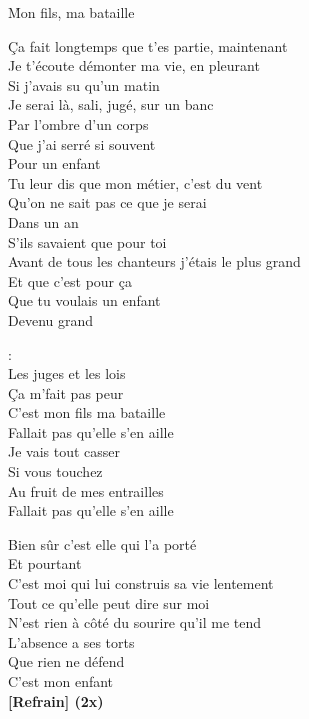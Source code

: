 \documentclass{novel}
\begin{document}
\newpage
\large

\h*{Mon fils, ma bataille}

\begin{multicols}{2}
Ça fait longtemps que t'es partie, maintenant\\
Je t'écoute démonter ma vie, en pleurant\\
Si j'avais su qu'un matin\\
Je serai là, sali, jugé, sur un banc\\
Par l'ombre d'un corps\\
Que j'ai serré si souvent\\
Pour un enfant\\

Tu leur dis que mon métier, c'est du vent\\
Qu'on ne sait pas ce que je serai\\
Dans un an\\
S'ils savaient que pour toi\\
Avant de tous les chanteurs j'étais le plus grand\\
Et que c'est pour ça\\
Que tu voulais un enfant\\
Devenu grand\\

\columnbreak
\begin{bfseries}
[Refrain]:\\
Les juges et les lois\\
Ça m'fait pas peur\\
C'est mon fils ma bataille\\
Fallait pas qu'elle s'en aille\\
Je vais tout casser\\
Si vous touchez\\
Au fruit de mes entrailles\\
Fallait pas qu'elle s'en aille\\
\end{bfseries}

Bien sûr c'est elle qui l'a porté\\
Et pourtant\\
C'est moi qui lui construis sa vie lentement\\
Tout ce qu'elle peut dire sur moi\\
N'est rien à côté du sourire qu'il me tend\\
L'absence a ses torts\\
Que rien ne défend\\
C'est mon enfant\\

\textbf{[Refrain] (2x)}
\end{multicols}
\end{document}
